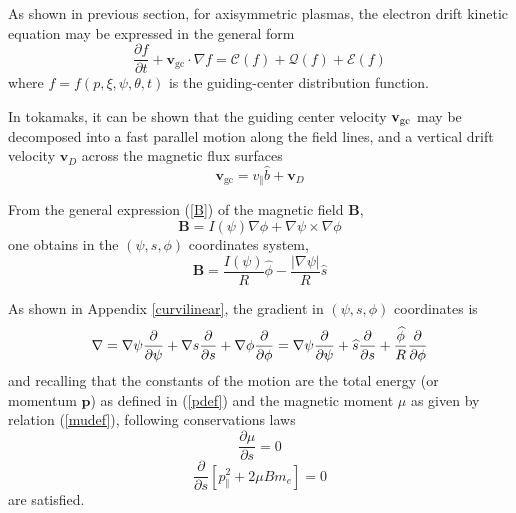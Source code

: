 

As shown in previous section, for axisymmetric plasmas, the electron drift
kinetic equation may be expressed in the general form
\begin{equation}
\frac{\partial f}{\partial t}+\mathbf{v}_{\text{gc}}\cdot \nabla f=\mathcal{C%
}\left( f\right) +\mathcal{Q}\left( f\right) +\mathcal{E}\left( f\right)
\label{dke1}
\end{equation}
where $f=f\left( p,\xi ,\psi ,\theta ,t\right) $ is the guiding-center
distribution function.

In tokamaks, it can be shown that the guiding center velocity $\mathbf{v}_{%
\text{gc}}$ may be decomposed into a fast parallel motion along the field
lines, and a vertical drift velocity $\mathbf{v}_{D}$ across the magnetic
flux surfaces
\begin{equation}
\mathbf{v}_{\text{gc}}=v_{\Vert }\widehat{b}+\mathbf{v}_{D}  \label{vgc}
\end{equation}

From the general expression (\ref{B}) of the magnetic field $\mathbf{B}$,
\begin{equation}
\mathbf{B}=I\left( \psi \right) \nabla \phi +\nabla \psi \times \nabla \phi
\label{bexp}
\end{equation}
one obtains in the $\left( \psi ,s,\phi \right) $ coordinates system,
\begin{equation}
\mathbf{B}=\frac{I\left( \psi \right) }{R}\widehat{\phi }-\frac{\left|
\nabla \psi \right| }{R}\widehat{s}  \label{bexp2}
\end{equation}

As shown in Appendix \ref{curvilinear}, the gradient in $\left( \psi ,s,\phi
\right) $ coordinates is
\begin{equation}
\nabla =\nabla \psi \frac{\partial }{\partial \psi }+\nabla s\frac{\partial
}{\partial s}+\nabla \phi \frac{\partial }{\partial \phi }=\nabla \psi \frac{%
\partial }{\partial \psi }+\widehat{s}\frac{\partial }{\partial s}+\frac{%
\widehat{\phi }}{R}\frac{\partial }{\partial \phi }  \label{gradient}
\end{equation}
and recalling that the constants of the motion are the total energy (or
momentum $\mathbf{p}$) as defined in (\ref{pdef}) and the magnetic moment $%
\mu $ as given by relation (\ref{mudef}), following conservations laws
\begin{equation}
\frac{\partial \mu }{\partial s}=0  \label{mucons}
\end{equation}
\begin{equation}
\frac{\partial }{\partial s}\left[ p_{\Vert }^{2}+2\mu Bm_{e}\right] =0
\label{encons}
\end{equation}
are satisfied.

